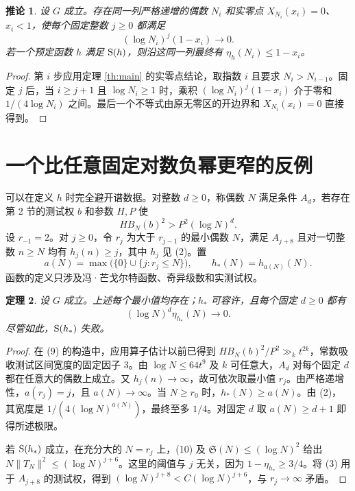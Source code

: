\documentclass[UTF8,a4paper,11pt,fontset=fandol]{ctexart}
\newtheorem{theorem}{定理}
\newtheorem{corollary}[theorem]{推论}
\newcommand{\Sg}{\mathfrak S}
\begin{document}
\begin{corollary}\label{co:seq}
设 \(G\) 成立。存在同一列严格递增的偶数 \(N_i\) 和实零点 \(X_{N_i}(x_i)=0\)、\(x_i<1\)，使每个固定整数 \(j\ge0\) 都满足
\[
             (\log N_i)^j(1-x_i)\longrightarrow 0.
\]
若一个预定函数 \(h\) 满足 \({\rm S}(h)\)，则沿这同一列最终有
\(\eta_h(N_i)\le 1-x_i\)。
\end{corollary}
\begin{proof}
第 \(i\) 步应用定理 \ref{th:main} 的实零点结论，取指数 \(i\) 且要求 \(N_i>N_{i-1}\)。固定 \(j\) 后，当 \(i\ge j+1\) 且 \(\log N_i\ge1\) 时，乘积 \((\log N_i)^j(1-x_i)\) 介于零和 \(1/(4\log N_i)\) 之间。最后一个不等式由原无零区的开边界和 \(X_{N_i}(x_i)=0\) 直接得到。
\end{proof}

\section{一个比任意固定对数负幂更窄的反例}

可以在定义 \(h\) 时完全避开谱数据。对整数 \(d\ge0\)，称偶数 \(N\) 满足条件 \(A_d\)，若存在第 2 节的测试权 \(b\) 和参数 \(H,P\) 使
\[
                H B_N(b)^2>P^2(\log N)^d .
\]
设 \(r_{-1}=2\)。对 \(j\ge0\)，令 \(r_j\) 为大于 \(r_{j-1}\) 的最小偶数 \(N\)，满足 \(A_{j+8}\) 且对一切整数 \(n\ge N\) 均有 \(h_j(n)\ge j\)，其中 \(h_j\) 见 (2)。置
\[
 a(N)=\max\big(\{0\}\cup\{j:r_j\le N\}\big),\qquad
                    h_*(N)=h_{a(N)}(N).
\]
函数的定义只涉及冯·芒戈尔特函数、奇异级数和实测试权。

\begin{theorem}\label{th:arithwidth}
设 \(G\) 成立。上述每个最小值均存在；\(h_*\) 可容许，且每个固定 \(d\ge0\) 都有
\[
             (\log N)^d\eta_{h_*}(N)\longrightarrow0 .
\]
尽管如此，\({\rm S}(h_*)\) 失败。
\end{theorem}
\begin{proof}
在 (9) 的构造中，应用算子估计以前已得到 \(HB_N(b)^2/P^2\gg_k t^{2k}\)，常数吸收测试区间宽度的固定因子 \(3\)。由 \(\log N\le64t^9\) 及 \(k\) 可任意大，\(A_d\) 对每个固定 \(d\) 都在任意大的偶数上成立。又 \(h_j(n)\to\infty\)，故可依次取最小值 \(r_j\)。由严格递增性，\(a(r_j)=j\)，且 \(a(N)\to\infty\)。当 \(N\ge r_0\) 时，\(h_*(N)\ge a(N)\)。由 (2)，其宽度是 \(1/(4(\log N)^{a(N)})\)，最终至多 \(1/4\)。对固定 \(d\) 取 \(a(N)\ge d+1\) 即得所述极限。

若 \({\rm S}(h_*)\) 成立，在充分大的 \(N=r_j\) 上，(10) 及 \(\Sg(N)\le(\log N)^2\) 给出 \(N\|T_N\|^2\le(\log N)^{j+6}\)。这里的阈值与 \(j\) 无关，因为 \(1-\eta_{h_*}\ge3/4\)。将 (3) 用于 \(A_{j+8}\) 的测试权，得到 \((\log N)^{j+8}< C(\log N)^{j+6}\)，与 \(r_j\to\infty\) 矛盾。
\end{proof}
\end{document}
